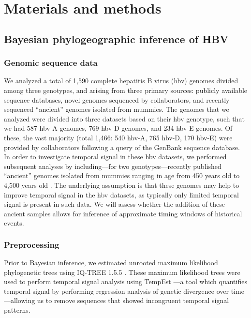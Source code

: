 \chapter{Materials and methods}
\label{ch:methodology}

\section{Bayesian phylogeographic inference of HBV}

\subsection{Genomic sequence data}
We analyzed a total of 1,590 complete hepatitis B virus (\gls{hbv}) genomes divided among three genotypes, and arising from three primary sources: publicly available sequence databases, novel genomes sequenced by collaborators, and recently sequenced ``ancient'' genomes isolated from mummies.
The genomes that we analyzed were divided into three datasets based on their \gls{hbv} genotype, such that we had 587 \gls{hbv}-A genomes, 769 \gls{hbv}-D genomes, and 234 \gls{hbv}-E genomes.
Of these, the vast majority (total 1,466: 540 \gls{hbv}-A, 765 \gls{hbv}-D, 170 \gls{hbv}-E) were provided by collaborators following a query of the GenBank sequence database. %
In order to investigate temporal signal in these \gls{hbv} datasets, we performed subsequent analyses by including---for two genotypes---recently published ``ancient'' genomes isolated from mummies ranging in age from 450 years old to 4,500 years old \cite{muhlemann2018ancient, ross2018paradox}.
The underlying assumption is that these genomes may help to improve temporal signal in the \gls{hbv} datasets, as typically only limited temporal signal is present in such data.
We will assess whether the addition of these ancient samples allows for inference of approximate timing windows of historical events.

\subsection{Preprocessing}

Prior to Bayesian inference, we estimated unrooted maximum likelihood phylogenetic trees using IQ-TREE 1.5.5 \cite{nguyen2015iq}.
These maximum likelihood trees were used to perform temporal signal analysis using TempEst \cite{rambaut2016exploring}---a tool which quantifies temporal signal by performing regression analysis of genetic divergence over time---allowing us to remove sequences that showed incongruent temporal signal patterns.

